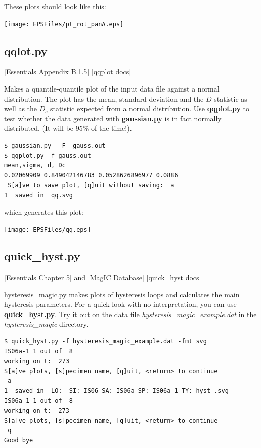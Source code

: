 \documentclass[11pt]{book}
\begin{document}
{{{{These plots should look like this:

\texttt{[image: EPSFiles/pt\_rot\_panA.eps]}


\subsection{qqlot.py} \href{http://earthref.org/MAGIC/books/Tauxe/Essentials/WebBook3ap2.html#quantile_quantile_plots}{[Essentials Appendix B.1.5]}
\href{https://github.com/PmagPy/PmagPy/blob/master/programs/qqplot.py}{[qqplot docs]}


Makes a quantile-quantile plot  of the input data file against a normal distribution.
The plot has the mean, standard deviation and the $D$ statistic as well as the $D_c$ statistic expected from
a normal distribution.  Use {\bf qqplot.py} to test whether the data generated with {\bf gaussian.py} is in fact normally distributed.
(It will be 95\% of the time!).

\begin{verbatim}
$ gaussian.py  -F  gauss.out
$ qqplot.py -f gauss.out
mean,sigma, d, Dc
0.02069909 0.849042146783 0.0528626896977 0.0886
 S[a]ve to save plot, [q]uit without saving:  a
1  saved in  qq.svg
\end{verbatim}

\noindent which generates this plot:

{%
\texttt{[image: EPSFiles/qq.eps]}}

%

\subsection{quick\_hyst.py}
\href{http://earthref.org/MAGIC/books/Tauxe/Essentials/WebBook3ch5.html#ch5}{[Essentials Chapter 5]} and \href{#MagICDatabase}{[MagIC Database]}
\href{https://github.com/PmagPy/PmagPy/blob/master/programs/quick_hyst.py}{[quick\_hyst docs]}

\href{#hysteresis_magic.py}{hysteresis\_magic.py} makes plots of hysteresis loops and calculates the main hysteresis parameters.  For a quick look with no interpretation, you can use {\bf quick\_hyst.py}.   Try it out on the data file {\it hysteresis\_magic\_example.dat} in the {\it hysteresis\_magic} directory.

\begin{verbatim}
$ quick_hyst.py -f hysteresis_magic_example.dat -fmt svg
IS06a-1 1 out of  8
working on t:  273
S[a]ve plots, [s]pecimen name, [q]uit, <return> to continue
 a
1  saved in  LO:__SI:_IS06_SA:_IS06a_SP:_IS06a-1_TY:_hyst_.svg
IS06a-1 1 out of  8
working on t:  273
S[a]ve plots, [s]pecimen name, [q]uit, <return> to continue
 q
Good bye
\end{verbatim}

}}}}
\end{document}
